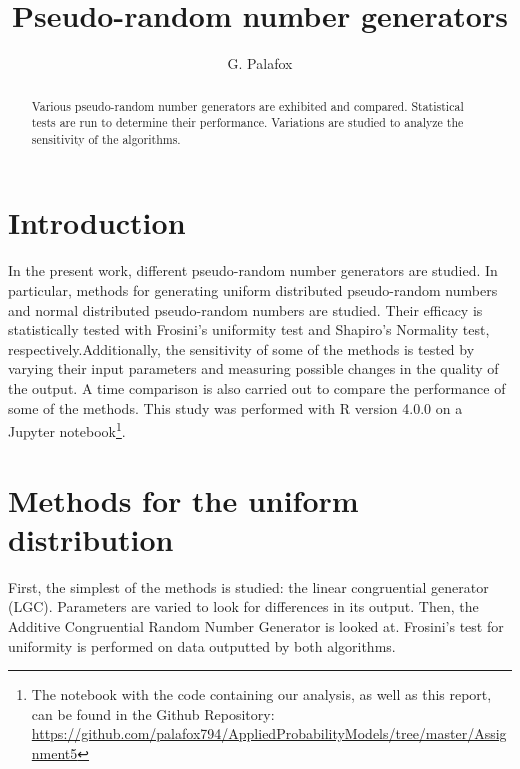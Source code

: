 \documentclass[letterpaper, 10 pt, conference]{article}
\title{Pseudo-random number generators}
\author{G. Palafox}
\begin{document}
\maketitle

\begin{abstract}
Various pseudo-random number generators are exhibited and compared. Statistical tests are run to determine their performance. Variations are studied to analyze the sensitivity of the algorithms. 
\end{abstract}

\section{Introduction}
In the present work, different pseudo-random number generators are studied. In particular, methods for generating uniform distributed pseudo-random numbers and normal distributed pseudo-random numbers are studied. Their efficacy is statistically tested with Frosini's uniformity test and Shapiro's Normality test, respectively.Additionally, the sensitivity of some of the methods is tested by varying their input parameters and measuring possible changes in the quality of the output. A time comparison is also carried out to compare the performance of some of the methods. This study was performed with R version 4.0.0 \cite{R} on a Jupyter \cite{jupyter} notebook\footnote{The notebook with the code containing our analysis, as well as this report, can be found in the Github Repository: \url{https://github.com/palafox794/AppliedProbabilityModels/tree/master/Assignment5}}. 

\section{Methods for the uniform distribution}
First, the simplest of the methods is studied: the linear congruential generator (\textsc{LGC}). Parameters are varied to look for differences in its output. Then, the Additive Congruential Random Number Generator is looked at. Frosini's test for uniformity \cite{Blinov_Lemeshko_2014} is performed on data outputted by both algorithms.
\end{document}
